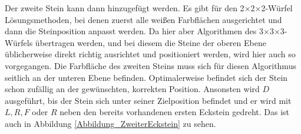 \documentclass[12pt,a4paper, usenames, dvipsnames]{article}
\theoremstyle{mystyle}
\theoremstyle{definition}
\newcommand{\Ttwo}{2$\times$2$\times$2-}
\newcommand{\Tthree}{3$\times$3$\times$3-}
\begin{document}
Der zweite Stein kann dann hinzugefügt werden. Es gibt für den \Ttwo Würfel Lösungsmethoden, bei denen zuerst alle weißen Farbflächen ausgerichtet und dann die Steinposition anpasst werden.
Da hier aber Algorithmen des \Tthree Würfels übertragen werden, und bei diesem die Steine der oberen Ebene üblicherweise direkt richtig ausrichtet und positioniert werden, wird hier auch so vorgegangen.
Die Farbfläche des zweiten Steins muss sich für diesen Algorithmus seitlich an der unteren Ebene befinden. Optimalerweise befindet sich der Stein schon zufällig an der gewünschten, korrekten Position.
Ansonsten wird $D$ ausgeführt, bis der Stein sich unter seiner Zielposition befindet und er wird mit $L, R, F$ oder $R$ neben den bereits vorhandenen ersten Eckstein gedreht. Das ist auch in Abbildung \ref{Abbildung_ZweiterEckstein} zu sehen.
\end{document}
